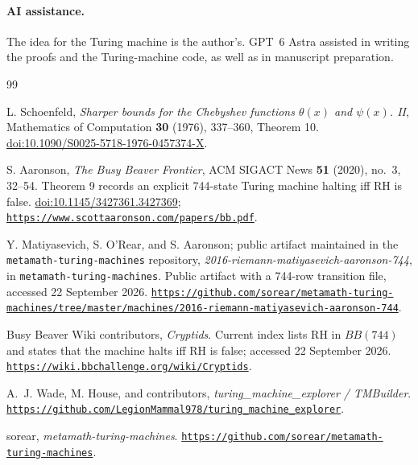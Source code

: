 \documentclass[10pt]{article}
\theoremstyle{definition}
\begin{document}
\clearpage

\paragraph{AI assistance.}
The idea for the Turing machine is the author's. GPT~6 Astra assisted
in writing the proofs and the Turing-machine code, as well as in
manuscript preparation.

\small
\setlength{\bibsep}{0.25em}
\begin{thebibliography}{99}

L. Schoenfeld,
\emph{Sharper bounds for the Chebyshev functions $\theta(x)$ and $\psi(x)$. II},
Mathematics of Computation \textbf{30} (1976), 337--360, Theorem 10.
\href{https://doi.org/10.1090/S0025-5718-1976-0457374-X}{doi:10.1090/S0025-5718-1976-0457374-X}.

S. Aaronson,
\emph{The Busy Beaver Frontier},
ACM SIGACT News \textbf{51} (2020), no.~3, 32--54.
Theorem 9 records an explicit 744-state Turing machine halting iff RH is false.
\href{https://doi.org/10.1145/3427361.3427369}{doi:10.1145/3427361.3427369};
\href{https://www.scottaaronson.com/papers/bb.pdf}{\nolinkurl{https://www.scottaaronson.com/papers/bb.pdf}}.

Y. Matiyasevich, S. O'Rear, and S. Aaronson;
public artifact maintained in the \texttt{metamath-turing-machines} repository,
\emph{2016-riemann-matiyasevich-aaronson-744},
in \texttt{metamath-turing-machines}.
Public artifact with a 744-row transition file, accessed 22 September 2026.
\href{https://github.com/sorear/metamath-turing-machines/tree/master/machines/2016-riemann-matiyasevich-aaronson-744}{\nolinkurl{https://github.com/sorear/metamath-turing-machines/tree/master/machines/2016-riemann-matiyasevich-aaronson-744}}.

Busy Beaver Wiki contributors,
\emph{Cryptids}.
Current index lists RH in $BB(744)$ and states that the machine halts iff RH is false; accessed 22 September 2026.
\href{https://wiki.bbchallenge.org/wiki/Cryptids}{\nolinkurl{https://wiki.bbchallenge.org/wiki/Cryptids}}.

A.~J. Wade, M. House, and contributors,
\emph{turing\_machine\_explorer / TMBuilder}.
\href{https://github.com/LegionMammal978/turing_machine_explorer}{\nolinkurl{https://github.com/LegionMammal978/turing_machine_explorer}}.

sorear,
\emph{metamath-turing-machines}.
\href{https://github.com/sorear/metamath-turing-machines}{\nolinkurl{https://github.com/sorear/metamath-turing-machines}}.

\end{thebibliography}
\end{document}
